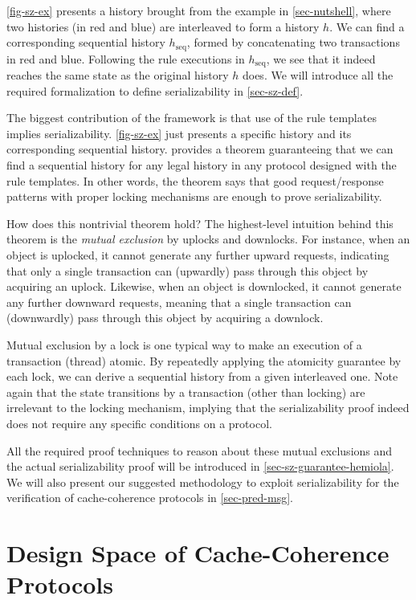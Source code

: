 \autoref{fig-sz-ex} presents a history brought from the example in \autoref{sec-nutshell}, where two histories (in {\color{myred} red} and {\color{myblue} blue}) are interleaved to form a history $h$.
We can find a corresponding sequential history $h_{\textrm{seq}}$, formed by concatenating two transactions in {\color{myred} red} and {\color{myblue} blue}.
Following the rule executions in $h_{\textrm{seq}}$, we see that it indeed reaches the same state as the original history $h$ does.
We will introduce all the required formalization to define serializability in \autoref{sec-sz-def}.

The biggest contribution of the \hemiola{} framework is that use of the rule templates implies serializability.
\autoref{fig-sz-ex} just presents a specific history and its corresponding sequential history.
\hemiola{} provides a theorem guaranteeing that we can find a sequential history for any legal history in any protocol designed with the rule templates.
In other words, the theorem says that good request/response patterns with proper locking mechanisms are enough to prove serializability.

How does this nontrivial theorem hold?
The highest-level intuition behind this theorem is the \emph{mutual exclusion} by uplocks and downlocks.
For instance, when an object is uplocked, it cannot generate any further upward requests, indicating that only a single transaction can (upwardly) pass through this object by acquiring an uplock.
Likewise, when an object is downlocked, it cannot generate any further downward requests, meaning that a single transaction can (downwardly) pass through this object by acquiring a downlock.

Mutual exclusion by a lock is one typical way to make an execution of a transaction (thread) atomic.
By repeatedly applying the atomicity guarantee by each lock, we can derive a sequential history from a given interleaved one.
Note again that the state transitions by a transaction (other than locking) are irrelevant to the locking mechanism, implying that the serializability proof indeed does not require any specific conditions on a protocol.

All the required proof techniques to reason about these mutual exclusions and the actual serializability proof will be introduced in \autoref{sec-sz-guarantee-hemiola}.
We will also present our suggested methodology to exploit serializability for the verification of cache-coherence protocols in \autoref{sec-pred-msg}.

\section{Design Space of Cache-Coherence Protocols}
\label{sec-design-space}

